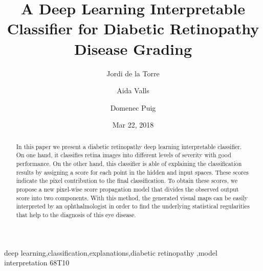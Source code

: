 \documentclass[review]{elsarticle}
\begin{document}
\begin{frontmatter}
	
	\title{A Deep Learning Interpretable Classifier for Diabetic Retinopathy Disease Grading}
	
	\author[rvt]{Jordi de la Torre}
	\author[rvt]{Aida Valls}
	\author[rvt]{Domenec Puig}
	
	
	\address[rvt]{Departament d'Enginyeria Inform\`atica i Matem\`atiques.\\Escola T\`ecnica Superior d'Enginyeria.\\Universitat Rovira i Virgili\\Avinguda Paisos Catalans, 26. E-43007\\
		Tarragona, Spain}
	
	\date{Mar 22, 2018}
	
	\begin{abstract}
In this paper we present a diabetic retinopathy deep learning interpretable classifier. On one hand, it classifies retina images into different levels of severity with good performance. On the other hand, this classifier is able of explaining the classification results by assigning a score for each point in the hidden and input spaces. These scores indicate the pixel contribution to the final classification. To obtain these scores, we propose a new pixel-wise score propagation model that divides the observed output score into two components. With this method, the generated visual maps can be easily interpreted by an ophthalmologist in order to find the underlying statistical regularities that help to the diagnosis of this eye disease.
	\end{abstract}
	
	\begin{keyword}
		deep learning\sep classification\sep explanations\sep diabetic retinopathy \sep model interpretation
		\MSC[2010] 68T10
	\end{keyword}
	
\end{frontmatter}
\end{document}
